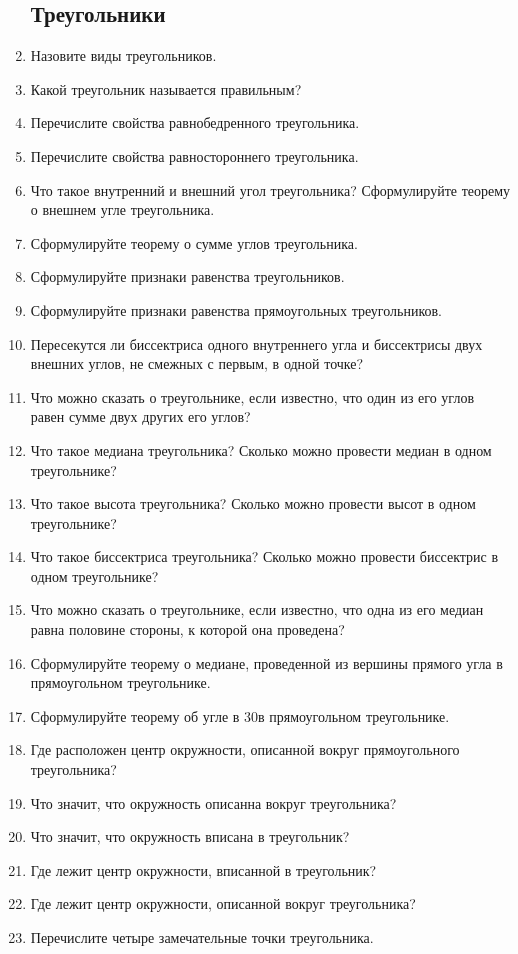 \documentclass[12pt, a4paper]{article}
\begin{document}
\begin{enumerate}
	\subsection{Треугольники}
	\item Назовите виды треугольников.
	\item Какой треугольник называется правильным?
	\item Перечислите свойства равнобедренного треугольника.
	\item Перечислите свойства равностороннего треугольника.
	\item Что такое внутренний и внешний угол треугольника? Сформулируйте теорему о внешнем угле треугольника.
	\item Сформулируйте теорему о сумме углов треугольника.
	\item Сформулируйте признаки равенства треугольников.
	\item Сформулируйте признаки равенства прямоугольных треугольников.
	\item Пересекутся ли биссектриса одного внутреннего угла и биссектрисы двух внешних углов, не смежных с первым, в одной точке?
	\item Что можно сказать о треугольнике, если известно, что один из его углов равен сумме двух других его углов?
	\item Что такое медиана треугольника? Сколько можно провести медиан в одном треугольнике?
	\item Что такое высота треугольника? Сколько можно провести высот в одном треугольнике?
	\item Что такое биссектриса треугольника? Сколько можно провести биссектрис в одном треугольнике?
	\item Что можно сказать о треугольнике, если известно, что одна из его медиан равна половине стороны, к которой она проведена?
	\item Сформулируйте теорему о медиане, проведенной из вершины прямого угла в прямоугольном треугольнике.
	\item Сформулируйте теорему об угле в 30\degree в прямоугольном треугольнике.
	\item Где расположен центр окружности, описанной вокруг прямоугольного треугольника?
	\item Что значит, что окружность описанна вокруг треугольника?
	\item Что значит, что окружность вписана в треугольник?
	\item Где лежит центр окружности, вписанной в треугольник?
	\item Где лежит центр окружности, описанной вокруг треугольника?
	\item Перечислите четыре замечательные точки треугольника.

\end{enumerate}
\end{document}
